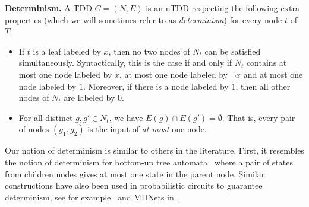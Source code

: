 \documentclass[a4paper,UKenglish,cleveref, autoref, thm-restate]{lipics-v2021}
\newcommand{\istefan}[1]{\todo[inline,color=pink]{Stefan: #1}}
\newcommand{\florent}[1]{\todo[color=green]{Florent: #1}}
\newcommand{\guy}[1]{\todo[color=purple]{\color{white}{{\bf Guy}: #1}}}
\begin{document}





\textbf{Determinism.} A TDD $C=(N,E)$ is an nTDD respecting the following extra properties (which we will sometimes refer to as \emph{determinism}) for every node $t$ of $T$:
\begin{itemize}  
\item If $t$ is a leaf labeled by $x$, then no two nodes of $N_t$ can be satisfied simultaneously. Syntactically, this is the case if and only if $N_t$ contains at most one node labeled by $x$, at most one node labeled by $\neg x$ and at most one node labeled by $1$. Moreover, if there is a node labeled by $1$, then all other nodes of $N_t$ are labeled by $0$. 
\item For all distinct $g,g' \in N_t$, we have $E(g) \cap E(g') = \emptyset$.  That is,  every pair of nodes $(g_1,g_2)$ is the input of \emph{at most} one node.
\end{itemize}

Our notion of determinism is similar to others in the literature. First, it resembles the notion of determinism for bottom-up tree automata~\cite{tata} where a pair of states from children nodes gives at most one state in the parent node. Similar constructions have also been used in probabilistic circuits to guarantee determinism, see for example~\cite{shih2020probabilistic} and MDNets in~\cite{wang2023compositional}. 
\end{document}
